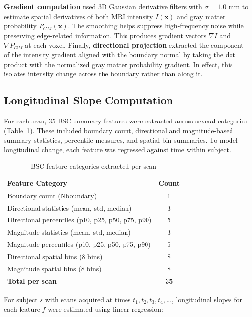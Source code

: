 \documentclass[blue]{ludusofficial}  %
\begin{document}
\textbf{Gradient computation} used 3D Gaussian derivative filters with $\sigma = 1.0$ mm to estimate spatial derivatives of both MRI intensity $I(\mathbf{x})$ and gray matter probability $P_{GM}(\mathbf{x})$. The smoothing helps suppress high-frequency noise while preserving edge-related information. This produces gradient vectors $\nabla I$ and $\nabla P_{GM}$ at each voxel. Finally, \textbf{directional projection} extracted the component of the intensity gradient aligned with the boundary normal by taking the dot product with the normalized gray matter probability gradient. In effect, this isolates intensity change across the boundary rather than along it.

\subsection{Longitudinal Slope Computation}

For each scan, 35 BSC summary features were extracted across several categories (Table~\ref{tab:bsc-features}). These included boundary count, directional and magnitude-based summary statistics, percentile measures, and spatial bin summaries. To model longitudinal change, each feature was regressed against time within subject.

\begin{table}[htbp]
\centering
\caption{BSC feature categories extracted per scan}
\label{tab:bsc-features}
\begin{tabular}{lc}
\hline
\textbf{Feature Category} & \textbf{Count} \\
\hline
Boundary count (Nboundary) & 1 \\
Directional statistics (mean, std, median) & 3 \\
Directional percentiles (p10, p25, p50, p75, p90) & 5 \\
Magnitude statistics (mean, std, median) & 3 \\
Magnitude percentiles (p10, p25, p50, p75, p90) & 5 \\
Directional spatial bins (8 bins) & 8 \\
Magnitude spatial bins (8 bins) & 8 \\
\hline
\textbf{Total per scan} & \textbf{35} \\
\hline
\end{tabular}
\end{table}

For subject $s$ with scans acquired at times $t_1, t_2, t_3, t_4, \ldots$, longitudinal slopes for each feature $f$ were estimated using linear regression:
\end{document}
